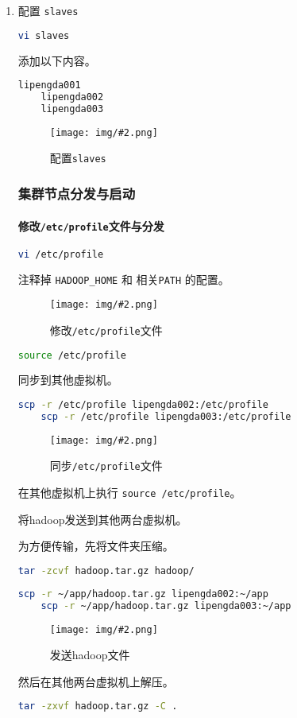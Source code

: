 \documentclass{article}
\newenvironment{enum}{
    \begin{enumerate}[label=(\arabic*), noitemsep]
}{
    \end{enumerate}
}
\newcommand{\img}[3][0.9]{%
    \begin{figure}[H]
        \centering
        \texttt{[image: img/\#2.png]}
        \caption{#3}
    \end{figure}
}
\newcommand{\subsubsubsection}[1]{\paragraph{#1}\mbox{}}
\begin{document}
\begin{enum}
    \item 配置 \texttt{slaves}
    
    \begin{lstlisting}[language=bash]
    vi slaves
    \end{lstlisting}

    添加以下内容。

    \begin{lstlisting}[language=bash]
    lipengda001
    lipengda002
    lipengda003
    \end{lstlisting}

    \img{7.1.2.6}{配置\texttt{slaves}}

    \subsubsection{集群节点分发与启动}

    \subsubsubsection{修改\texttt{/etc/profile}文件与分发}

    \begin{lstlisting}[language=bash]
    vi /etc/profile
    \end{lstlisting}

    注释掉 \texttt{HADOOP\_HOME} 和 相关\texttt{PATH} 的配置。

    \img{7.1.2.7}{修改\texttt{/etc/profile}文件}

    \begin{lstlisting}[language=bash]
    source /etc/profile
    \end{lstlisting}

    同步到其他虚拟机。

    \begin{lstlisting}[language=bash]
    scp -r /etc/profile lipengda002:/etc/profile
    scp -r /etc/profile lipengda003:/etc/profile
    \end{lstlisting}

    \img{7.1.2.8}{同步\texttt{/etc/profile}文件}

    在其他虚拟机上执行 \texttt{source /etc/profile}。

    将hadoop发送到其他两台虚拟机。

    为方便传输，先将文件夹压缩。

    \begin{lstlisting}[language=bash]
    tar -zcvf hadoop.tar.gz hadoop/
    \end{lstlisting}

    \begin{lstlisting}[language=bash]
    scp -r ~/app/hadoop.tar.gz lipengda002:~/app
    scp -r ~/app/hadoop.tar.gz lipengda003:~/app
    \end{lstlisting}

    \img{7.1.2.9}{发送hadoop文件}

    然后在其他两台虚拟机上解压。

    \begin{lstlisting}[language=bash]
    tar -zxvf hadoop.tar.gz -C .
    \end{lstlisting}
\end{enum}
\end{document}
